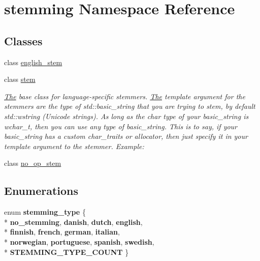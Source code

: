 \hypertarget{namespacestemming}{\section{stemming Namespace Reference}
\label{namespacestemming}
}
\subsection*{Classes}
\begin{DoxyCompactItemize}
\item 
class \hyperlink{classstemming_1_1english__stem}{english\-\_\-stem}
\item 
class \hyperlink{classstemming_1_1stem}{stem}
\begin{DoxyCompactList}\small\item\em \hyperlink{class_the}{The} base class for language-\/specific stemmers. \hyperlink{class_the}{The} template argument for the stemmers are the type of std\-::basic\-\_\-string that you are trying to stem, by default std\-::wstring (Unicode strings). As long as the char type of your basic\-\_\-string is wchar\-\_\-t, then you can use any type of basic\-\_\-string. This is to say, if your basic\-\_\-string has a custom char\-\_\-traits or allocator, then just specify it in your template argument to the stemmer. Example\-: \end{DoxyCompactList}\item 
class \hyperlink{classstemming_1_1no__op__stem}{no\-\_\-op\-\_\-stem}
\end{DoxyCompactItemize}
\subsection*{Enumerations}
\begin{DoxyCompactItemize}
\item 
enum {\bfseries stemming\-\_\-type} \{ \\*
{\bfseries no\-\_\-stemming}, 
{\bfseries danish}, 
{\bfseries dutch}, 
{\bfseries english}, 
\\*
{\bfseries finnish}, 
{\bfseries french}, 
{\bfseries german}, 
{\bfseries italian}, 
\\*
{\bfseries norwegian}, 
{\bfseries portuguese}, 
{\bfseries spanish}, 
{\bfseries swedish}, 
\\*
{\bfseries S\-T\-E\-M\-M\-I\-N\-G\-\_\-\-T\-Y\-P\-E\-\_\-\-C\-O\-U\-N\-T}
 \}
\end{DoxyCompactItemize}
